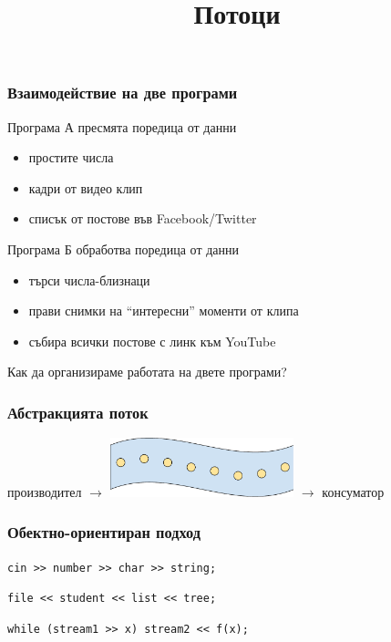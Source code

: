 \documentclass{beamer}
\title{Потоци}
\begin{document}
\begin{frame}
  \titlepage
\end{frame}

\begin{frame}
  \frametitle{Взаимодействие на две програми}

  Програма А пресмята поредица от данни
  \begin{itemize}
  \item простите числа
  \item кадри от видео клип
  \item списък от постове във Facebook/Twitter
  \end{itemize}
  \vspace{1em}
  
  Програма Б обработва поредица от данни
  \begin{itemize}
  \item търси числа-близнаци
  \item прави снимки на ``интересни'' моменти от
    клипа
  \item събира всички постове с линк към YouTube
  \end{itemize}
  \vspace{2em}
  
  \alert{Как да организираме работата на двете програми?}
\end{frame}

\begin{frame}
  \frametitle{Абстракцията поток}

  \begin{center}
    производител
    $\longrightarrow$ \includegraphics[width=0.4\textwidth,valign=c]{images/abstract_stream.pdf}
    $\longrightarrow$ консуматор
  \end{center}
\end{frame}

\begin{frame}
  \frametitle{Обектно-ориентиран подход}

  \tt{cin >{}> number >{}> char >{}> string;}
  \vspace{2em}

  \tt{file <{}< student <{}< list <{}< tree;}
  \vspace{2em}
  
  \tt{while (stream1 >{}> x) stream2 <{}< f(x);}
\end{frame}
\end{document}
